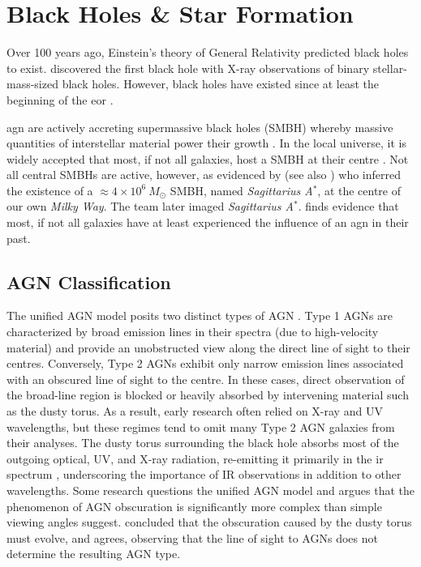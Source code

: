 \section{Black Holes \& Star Formation} \label{Sec: Active Galactic Nuclei}
Over 100 years ago, Einstein's theory of General Relativity \citep{einstein_feldgleichungen_1915} predicted black holes to exist. \cite{webster_cygnus_1972} discovered the first black hole with X-ray observations of binary stellar-mass-sized black holes. However, black holes have existed since at least the beginning of the \gls{eor} \citep{barkana_beginning_2001}.

\gls{agn} are actively accreting supermassive black holes (SMBH) whereby massive quantities of interstellar material power their growth \citep{hopkins_cosmological_2008, han_evolution_2012, toba_9_2013, brown_infrared_2019}. In the local universe, it is widely accepted that most, if not all galaxies, host a SMBH at their centre \citep{gruppioni_modelling_2011, han_evolution_2012, brown_infrared_2019}. Not all central SMBHs are active, however, as evidenced by \cite{ghez_high_1998} (see also \citealp{balick_intense_1974, genzel_stellar_2000}) who inferred the existence of a $\approx 4 \times 10^{6}\ M_{\odot}$ SMBH, named \textit{Sagittarius A$^*$}, at the centre of our own \textit{Milky Way}. The \cite{event_horizon_telescope_collaboration_first_2022} team later imaged \textit{Sagittarius A$^*$}. \cite{gruppioni_modelling_2011} finds evidence that most, if not all galaxies have at least experienced the influence of an \gls{agn} in their past. 

\subsection{AGN Classification}
The unified AGN model posits two distinct types of AGN \citep{urry_unified_1995, toba_9_2013}. Type 1 AGNs are characterized by broad emission lines in their spectra (due to high-velocity material) and provide an unobstructed view along the direct line of sight to their centres. Conversely, Type 2 AGNs exhibit only narrow emission lines associated with an obscured line of sight to the centre. In these cases, direct observation of the broad-line region is blocked or heavily absorbed by intervening material such as the dusty torus. As a result, early research often relied on X-ray \citep{miyaji_detailed_2015} and UV \citep{paltani_vimos_2007} wavelengths, but these regimes tend to omit many Type 2 AGN galaxies from their analyses. The dusty torus surrounding the black hole absorbs most of the outgoing optical, UV, and X-ray radiation, re-emitting it primarily in the \gls{ir} spectrum \citep{fu_decomposing_2010, wu_mid-infrared_2011, assef_mid-ir-_2011, han_evolution_2012, toba_9_2013, brown_infrared_2019, symeonidis_agn_2021}, underscoring the importance of IR observations in addition to other wavelengths. Some research questions the unified AGN model and argues that the phenomenon of AGN obscuration is significantly more complex than simple viewing angles suggest. \cite{han_evolution_2012} concluded that the obscuration caused by the dusty torus must evolve, and \cite{brown_infrared_2019} agrees, observing that the line of sight to AGNs does not determine the resulting AGN type.

